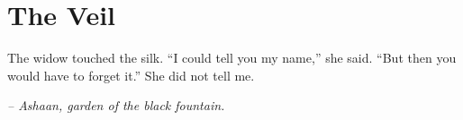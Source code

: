 \chapter*{The Veil}

The widow touched the silk. “I could tell you my name,” she said. “But then you would have to forget it.” She did not tell me.

\smallskip

\noindent \textit{– Ashaan, garden of the black fountain.}

